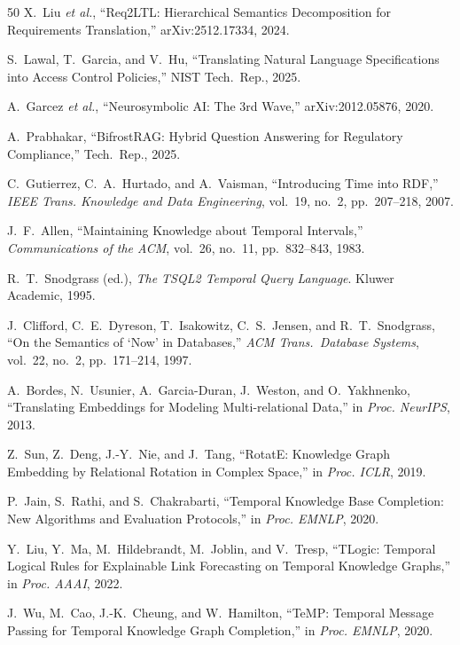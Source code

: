 \documentclass{ieeeaccess}
\begin{document}
\begin{thebibliography}{50}
X.~Liu \textit{et al.}, ``Req2LTL: Hierarchical Semantics Decomposition for Requirements Translation,'' arXiv:2512.17334, 2024.

S.~Lawal, T.~Garcia, and V.~Hu, ``Translating Natural Language Specifications into Access Control Policies,'' NIST Tech.\ Rep., 2025.

A.~Garcez \textit{et al.}, ``Neurosymbolic AI: The 3rd Wave,'' arXiv:2012.05876, 2020.

A.~Prabhakar, ``BifrostRAG: Hybrid Question Answering for Regulatory Compliance,'' Tech.\ Rep., 2025.

C.~Gutierrez, C.~A.~Hurtado, and A.~Vaisman, ``Introducing Time into RDF,'' \textit{IEEE Trans. Knowledge and Data Engineering}, vol.~19, no.~2, pp.~207--218, 2007.

J.~F.~Allen, ``Maintaining Knowledge about Temporal Intervals,'' \textit{Communications of the ACM}, vol.~26, no.~11, pp.~832--843, 1983.

R.~T.~Snodgrass (ed.), \textit{The TSQL2 Temporal Query Language}. Kluwer Academic, 1995.

J.~Clifford, C.~E.~Dyreson, T.~Isakowitz, C.~S.~Jensen, and R.~T.~Snodgrass, ``On the Semantics of `Now' in Databases,'' \textit{ACM Trans.\ Database Systems}, vol.~22, no.~2, pp.~171--214, 1997.

A.~Bordes, N.~Usunier, A.~Garcia-Duran, J.~Weston, and O.~Yakhnenko, ``Translating Embeddings for Modeling Multi-relational Data,'' in \textit{Proc. NeurIPS}, 2013.

Z.~Sun, Z.~Deng, J.-Y.~Nie, and J.~Tang, ``RotatE: Knowledge Graph Embedding by Relational Rotation in Complex Space,'' in \textit{Proc. ICLR}, 2019.

P.~Jain, S.~Rathi, and S.~Chakrabarti, ``Temporal Knowledge Base Completion: New Algorithms and Evaluation Protocols,'' in \textit{Proc. EMNLP}, 2020.

Y.~Liu, Y.~Ma, M.~Hildebrandt, M.~Joblin, and V.~Tresp, ``TLogic: Temporal Logical Rules for Explainable Link Forecasting on Temporal Knowledge Graphs,'' in \textit{Proc. AAAI}, 2022.

J.~Wu, M.~Cao, J.-K.~Cheung, and W.~Hamilton, ``TeMP: Temporal Message Passing for Temporal Knowledge Graph Completion,'' in \textit{Proc. EMNLP}, 2020.


\end{thebibliography}
\end{document}
